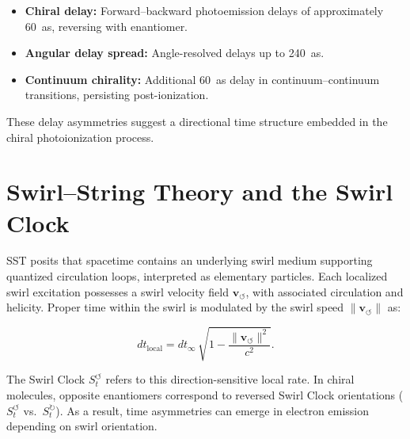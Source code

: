 \documentclass[smallextended]{svjour3}       %
\newcommand{\vswirl}{\mathbf{v}_{\!\boldsymbol{\circlearrowleft}}}
\newcommand{\SwirlClock}{S_t^{\boldsymbol{\circlearrowleft}}}
\newcommand{\SwirlClockcw}{S_t^{\boldsymbol{\circlearrowright}}}
\newcommand{\vnorm}{\lVert \mathbf{v}_{\!\boldsymbol{\circlearrowleft}}\rVert}
\begin{document}
\begin{itemize}
    \item \textbf{Chiral delay:} Forward--backward photoemission delays of approximately \SI{60}{\atto\second}, reversing with enantiomer.
    \item \textbf{Angular delay spread:} Angle-resolved delays up to \SI{240}{\atto\second}.
    \item \textbf{Continuum chirality:} Additional \SI{60}{\atto\second} delay in continuum--continuum transitions, persisting post-ionization.
\end{itemize}


These delay asymmetries suggest a directional time structure embedded in the chiral photoionization process.


\section{Swirl--String Theory and the Swirl Clock}
SST posits that spacetime contains an underlying swirl medium supporting quantized circulation loops, interpreted as elementary particles. Each localized swirl excitation possesses a swirl velocity field $\vswirl$, with associated circulation and helicity. Proper time within the swirl is modulated by the swirl speed $\vnorm$ as:


\begin{equation}
  dt_{\text{local}} = dt_{\infty}\,\sqrt{1 - \frac{\vnorm^2}{c^2}}.
\end{equation}


The Swirl Clock $\SwirlClock$ refers to this direction-sensitive local rate. In chiral molecules, opposite enantiomers correspond to reversed Swirl Clock orientations ($\SwirlClock$ vs.~$\SwirlClockcw$). As a result, time asymmetries can emerge in electron emission depending on swirl orientation.

\end{document}
